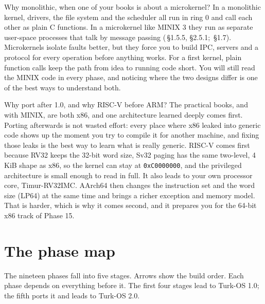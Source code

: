 \documentclass[11pt,a4paper]{article}
\begin{document}
\begin{decisionbox}{Why monolithic, when one of your books is about a microkernel?}
In a monolithic kernel, drivers, the file system and the scheduler all run in ring 0 and call each other as plain C
functions. In a microkernel like MINIX 3 they run as separate user-space processes that talk by message passing
(\OSDI\,\S1.5.5, \S2.5.1; \MOS\,\S1.7). Microkernels isolate faults better, but they force you to build IPC,
servers and a protocol for every operation before anything works. For a first kernel, plain function calls keep
the path from idea to running code short. You will still read the MINIX code in every phase, and noticing where the
two designs differ is one of the best ways to understand both.
\end{decisionbox}

\begin{decisionbox}{Why port after 1.0, and why RISC-V before ARM?}
The practical books, \LOB and \OSDI with MINIX, are both x86, and one architecture learned deeply comes first.
Porting afterwards is not wasted effort: every place where x86 leaked into generic code shows up the moment you try
to compile it for another machine, and fixing those leaks is the best way to learn what is really generic. RISC-V
comes first because RV32 keeps the 32-bit word size, Sv32 paging has the same two-level, 4\,KiB shape as x86, so
the kernel can stay at \texttt{0xC0000000}, and the privileged architecture is small enough to read in full. It
also leads to your own processor core, Timur-RV32IMC. AArch64 then changes the instruction set and the word size
(LP64) at the same time and brings a richer exception and memory model. That is harder, which is why it comes
second, and it prepares you for the 64-bit x86 track of Phase 15.
\end{decisionbox}

\section{The phase map}

The nineteen phases fall into five stages. Arrows show the build order. Each phase depends on everything before it.
The first four stages lead to Turk-OS 1.0; the fifth ports it and leads to Turk-OS 2.0.
\end{document}

